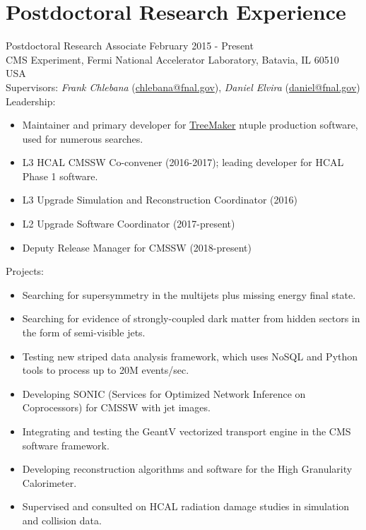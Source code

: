 \setlength{\parskip}{0pt}
\section{Postdoctoral Research Experience}
Postdoctoral Research Associate \hfill February 2015 - Present\\
CMS Experiment, Fermi National Accelerator Laboratory, Batavia, IL 60510 USA\\
Supervisors: {\sl Frank Chlebana} (\href{mailto:chlebana@fnal.gov}{chlebana@fnal.gov}), {\sl Daniel Elvira} (\href{mailto:daniel@fnal.gov}{daniel@fnal.gov})\\
Leadership:
\begin{itemize}[leftmargin=12pt]
\item Maintainer and primary developer for \href{https://github.com/TreeMaker/TreeMaker}{TreeMaker} ntuple production software, used for numerous searches.
\item L3 HCAL CMSSW Co-convener (2016-2017); leading developer for HCAL Phase 1 software.
\item L3 Upgrade Simulation and Reconstruction Coordinator (2016)
\item L2 Upgrade Software Coordinator (2017-present)
\item Deputy Release Manager for CMSSW (2018-present)
\end{itemize}
Projects:
\begin{itemize}[leftmargin=12pt]
\item Searching for supersymmetry in the multijets plus missing energy final state.
\item Searching for evidence of strongly-coupled dark matter from hidden sectors in the form of semi-visible jets.
\item Testing new striped data analysis framework, which uses NoSQL and Python tools to process up to 20M events/sec.
\item Developing SONIC (Services for Optimized Network Inference on Coprocessors) for CMSSW with jet images.
\item Integrating and testing the GeantV vectorized transport engine in the CMS software framework.
\item Developing reconstruction algorithms and software for the High Granularity Calorimeter.
\item Supervised and consulted on HCAL radiation damage studies in simulation and collision data.
\end{itemize}
